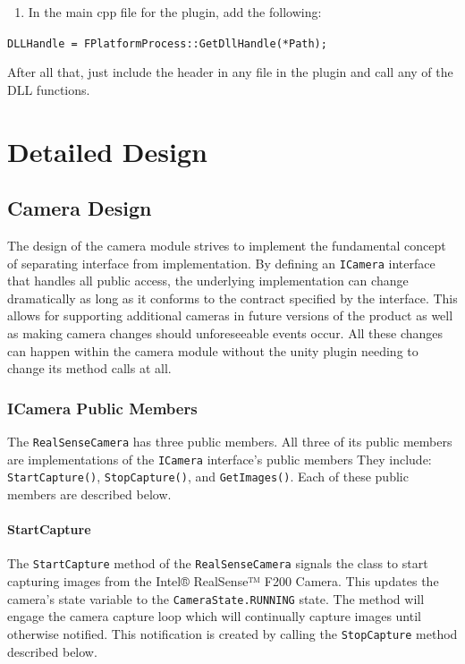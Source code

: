 \documentclass[12pt]{article}
\providecommand{\tightlist}{%
  \setlength{\itemsep}{0pt}\setlength{\parskip}{0pt}}
\begin{document}
\begin{enumerate}
\def\labelenumi{\arabic{enumi}.}
\setcounter{enumi}{1}
\tightlist
\item
  In the main cpp file for the plugin, add the following:
\end{enumerate}

\texttt{DLLHandle\ =\ FPlatformProcess::GetDllHandle(*Path);}

After all that, just include the header in any file in the plugin and
call any of the DLL functions.

\section{Detailed Design}\label{detailed-design}

\subsection{Camera Design}\label{camera-design}

The design of the camera module strives to implement the fundamental
concept of separating interface from implementation. By defining an
\texttt{ICamera} interface that handles all public access, the
underlying implementation can change dramatically as long as it conforms
to the contract specified by the interface. This allows for supporting
additional cameras in future versions of the product as well as making
camera changes should unforeseeable events occur. All these changes can
happen within the camera module without the unity plugin needing to
change its method calls at all.

\subsubsection{ICamera Public Members}\label{icamera-public-members}

The \texttt{RealSenseCamera} has three public members. All three of its
public members are implementations of the \texttt{ICamera} interface's
public members They include: \texttt{StartCapture()},
\texttt{StopCapture()}, and \texttt{GetImages()}. Each of these public
members are described below.

\paragraph{StartCapture}\label{startcapture}

The \texttt{StartCapture} method of the \texttt{RealSenseCamera} signals
the class to start capturing images from the Intel® RealSense™ F200
Camera. This updates the camera's state variable to the
\texttt{CameraState.RUNNING} state. The method will engage the camera
capture loop which will continually capture images until otherwise
notified. This notification is created by calling the
\texttt{StopCapture} method described below.
\end{document}
